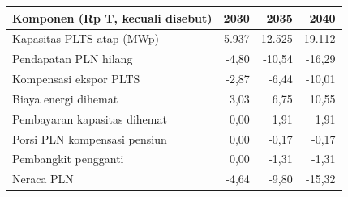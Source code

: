 \begin{tabular}{lrrr}
\toprule
Komponen (Rp T, kecuali disebut) & 2030 & 2035 & 2040 \\
\midrule
Kapasitas PLTS atap (MWp) & 5.937 & 12.525 & 19.112 \\
Pendapatan PLN hilang & -4,80 & -10,54 & -16,29 \\
Kompensasi ekspor PLTS & -2,87 & -6,44 & -10,01 \\
Biaya energi dihemat & 3,03 & 6,75 & 10,55 \\
Pembayaran kapasitas dihemat & 0,00 & 1,91 & 1,91 \\
Porsi PLN kompensasi pensiun & 0,00 & -0,17 & -0,17 \\
Pembangkit pengganti & 0,00 & -1,31 & -1,31 \\
Neraca PLN & -4,64 & -9,80 & -15,32 \\
\bottomrule
\end{tabular}
